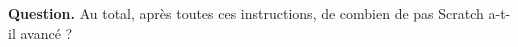 \documentclass[class=report,crop=false, 12pt]{standalone}
\begin{document}
\begin{enigme}
\begin{minipage}{0.49\textwidth}
\begin{center}
\begin{scratch}
\end{scratch}
\end{center}
\end{minipage}


\bigskip

\textbf{Question.} Au total, après toutes ces instructions, de combien de pas Scratch a-t-il avancé ?



\end{enigme}
\end{document}
